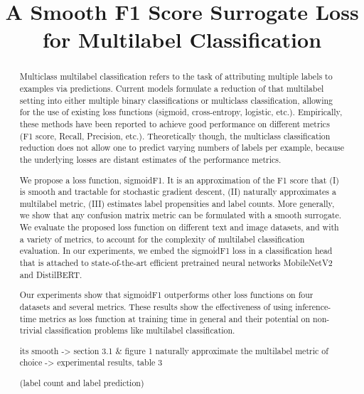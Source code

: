 \documentclass[sigconf,natbib,screen=true,review=true,anonymous]{acmart}
\begin{document}
\title[A Smooth F1 Score Surrogate Loss for Multilabel Classification]{A Smooth F1 Score Surrogate Loss for Multilabel Classification}


\begin{abstract}

  Multiclass multilabel classification refers to the task of attributing multiple labels to examples via predictions. Current models formulate a reduction of that multilabel setting into either multiple binary classifications or multiclass classification, allowing for the use of existing loss functions (sigmoid, cross-entropy, logistic, etc.). Empirically, these methods have been reported to achieve good performance on different metrics (F1 score, Recall, Precision, etc.). Theoretically though, the multiclass classification reduction does not allow one to predict varying numbers of labels per example, because the underlying losses are distant estimates of the performance metrics.

  We propose a loss function, sigmoidF1. It is an approximation of the F1 score that (I) is smooth and tractable for stochastic gradient descent, (II) naturally approximates a multilabel metric, (III) estimates label propensities and label counts. More generally, we show that any confusion matrix metric can be formulated with a smooth surrogate. We evaluate the proposed loss function on different text and image datasets, and with a variety of metrics, to account for the complexity of multilabel classification evaluation. In our experiments, we embed the sigmoidF1 loss in a classification head that is attached to state-of-the-art efficient pretrained neural networks MobileNetV2 and DistilBERT.

Our experiments show that sigmoidF1 outperforms other loss functions on four datasets and several metrics. These results show the effectiveness of using inference-time metrics as loss function at training time in general and their potential on non-trivial classification problems like multilabel classification.

its smooth -> section 3.1 & figure 1
naturally approximate the multilabel metric of choice -> experimental results, table 3

(label count and label prediction)


\end{abstract}
\end{document}
